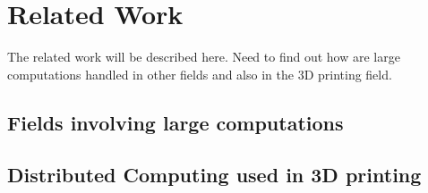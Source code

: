 \chapter{Related Work}
The related work will be described here. Need to find out how are large computations handled in other fields and also in the 3D printing field. 
\section{Fields involving large computations}
\section{Distributed Computing used in 3D printing}
